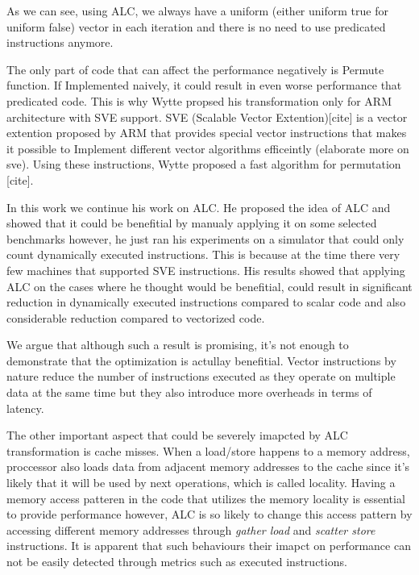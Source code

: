 \documentclass[\main/thesis.tex]{subfiles}
\begin{document}
As we can see, using ALC, we always have a uniform (either uniform true for uniform false) vector in each iteration and there is no need to use predicated instructions anymore. 

The only part of code that can affect the performance negatively is Permute function. If Implemented naively, it could result in even worse performance that predicated code. This is why Wytte propsed his transformation only for ARM architecture with SVE support. SVE (Scalable Vector Extention)[cite] is a vector extention
proposed by ARM that provides special vector instructions that makes it possible to Implement different vector algorithms efficeintly (elaborate more on sve). Using these instructions, Wytte proposed a fast algorithm for permutation [cite].

In this work we continue his work on ALC. He proposed the idea of ALC and showed that it could be benefitial by manualy applying it on some selected benchmarks however, he just ran his experiments on a simulator that could only count dynamically executed instructions. This is because at the time there very few machines 
that supported SVE instructions. His results showed that applying ALC on the cases where he thought would be benefitial, could result in significant reduction in dynamically executed instructions compared to scalar code and also considerable reduction compared to vectorized code.

We argue that although such a result is promising, it's not enough to demonstrate that the optimization is actullay benefitial. Vector instructions by nature reduce the number of instructions executed as they operate on multiple data at the same time but they also introduce more overheads in terms of latency. 

The other important aspect that could be severely imapcted by ALC transformation is cache misses. When a load/store happens to a memory address, proccessor also loads data from adjacent memory addresses to the cache since it's likely that it will be used by next operations, which is called locality. Having a memory access patteren in the code that 
utilizes the memory locality is essential to provide performance however, ALC is so likely to change this access pattern by accessing different memory addresses through \emph{gather load} and \emph{scatter store} instructions. It is apparent that such behaviours their imapct on performance can not be easily detected through metrics such as executed instructions.
\end{document}
